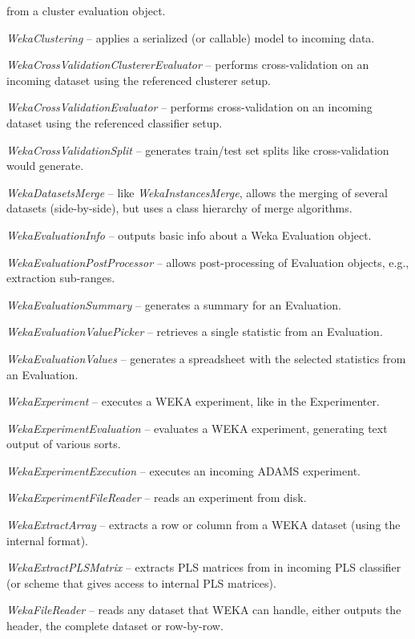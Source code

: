\begin{tight_itemize}
	from a cluster evaluation object.
	\item \textit{WekaClustering} -- applies a serialized (or callable) model
	to incoming data.
	\item \textit{WekaCrossValidationClustererEvaluator} -- performs cross-validation
	on an incoming dataset using the referenced clusterer setup.
	\item \textit{WekaCrossValidationEvaluator} -- performs cross-validation
	on an incoming dataset using the referenced classifier setup.
	\item \textit{WekaCrossValidationSplit} -- generates train/test set splits
	like cross-validation would generate.
	\item \textit{WekaDatasetsMerge} -- like \textit{WekaInstancesMerge},
	allows the merging of several datasets (side-by-side), but uses a class
	hierarchy of merge algorithms.
	\item \textit{WekaEvaluationInfo} -- outputs basic info about a Weka
	Evaluation object.
	\item \textit{WekaEvaluationPostProcessor} -- allows post-processing
	of Evaluation objects, e.g., extraction sub-ranges.
	\item \textit{WekaEvaluationSummary} -- generates a summary for an
	Evaluation.
	\item \textit{WekaEvaluationValuePicker} -- retrieves a single statistic
	from an Evaluation.
	\item \textit{WekaEvaluationValues} -- generates a spreadsheet with the
	selected statistics from an Evaluation.
	\item \textit{WekaExperiment} -- executes a WEKA experiment, like in the 
	Experimenter.
	\item \textit{WekaExperimentEvaluation} -- evaluates a WEKA experiment,
	generating text output of various sorts.
	\item \textit{WekaExperimentExecution} -- executes an incoming ADAMS
	experiment.
	\item \textit{WekaExperimentFileReader} -- reads an experiment from disk.
	\item \textit{WekaExtractArray} -- extracts a row or column from a WEKA
	dataset (using the internal format).
	\item \textit{WekaExtractPLSMatrix} -- extracts PLS matrices from in
	incoming PLS classifier (or scheme that gives access to internal PLS matrices).
	\item \textit{WekaFileReader} -- reads any dataset that WEKA can handle,
	either outputs the header, the complete dataset or row-by-row.

\end{tight_itemize}
